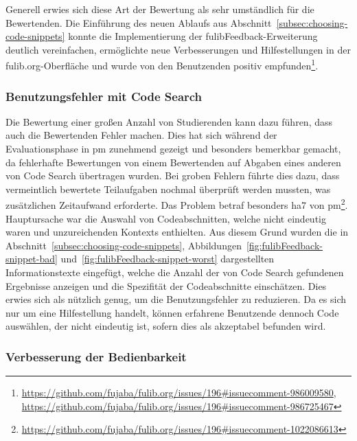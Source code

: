 Generell erwies sich diese Art der Bewertung als sehr umständlich für die Bewertenden.
Die Einführung des neuen Ablaufs aus Abschnitt~\ref{subsec:choosing-code-snippets} konnte die Implementierung der fulibFeedback-Erweiterung deutlich vereinfachen, ermöglichte neue Verbesserungen und Hilfestellungen in der fulib.org-Oberfläche und wurde von den Benutzenden positiv empfunden\footnote{
    \url{https://github.com/fujaba/fulib.org/issues/196\#issuecomment-986009580},
    \url{https://github.com/fujaba/fulib.org/issues/196\#issuecomment-986725467}
}.

\subsubsection{Benutzungsfehler mit Code Search}

Die Bewertung einer großen Anzahl von Studierenden kann dazu führen, dass auch die Bewertenden Fehler machen.
Dies hat sich während der Evaluationsphase in \ac{pm} zunehmend gezeigt und besonders bemerkbar gemacht, da fehlerhafte Bewertungen von einem Bewertenden auf Abgaben eines anderen von Code Search übertragen wurden.
Bei groben Fehlern führte dies dazu, dass vermeintlich bewertete Teilaufgaben nochmal überprüft werden mussten, was zusätzlichen Zeitaufwand erforderte.
Das Problem betraf besonders \ac{ha}7 von \ac{pm}\footnote{
    \url{https://github.com/fujaba/fulib.org/issues/196\#issuecomment-1022086613}
}.
Hauptursache war die Auswahl von Codeabschnitten, welche nicht eindeutig waren und unzureichenden Kontexts enthielten.
Aus diesem Grund wurden die in Abschnitt~\ref{subsec:choosing-code-snippets}, Abbildungen~\ref{fig:fulibFeedback-snippet-bad} und~\ref{fig:fulibFeedback-snippet-worst} dargestellten Informationstexte eingefügt, welche die Anzahl der von Code Search gefundenen Ergebnisse anzeigen und die Spezifität der Codeabschnitte einschätzen.
Dies erwies sich als nützlich genug, um die Benutzungsfehler zu reduzieren.
Da es sich nur um eine Hilfestellung handelt, können erfahrene Benutzende dennoch Code auswählen, der nicht eindeutig ist, sofern dies als akzeptabel befunden wird.

\subsubsection{Verbesserung der Bedienbarkeit}

